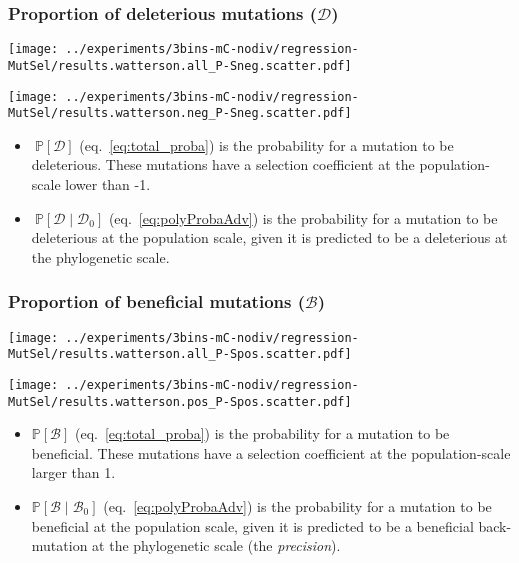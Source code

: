 \documentclass[12pt]{article}
\newcommand{\proba}{\mathbb{P}}
\newcommand{\SphyDel}{\mathcal{D}_0}
\newcommand{\SphyBen}{\mathcal{B}_0}
\newcommand{\given}{\mid}
\newcommand{\SpopDel}{\mathcal{D}}
\newcommand{\SpopBen}{\mathcal{B}}
\begin{document}
    \subsubsection{Proportion of deleterious mutations ($\SpopDel$)}\label{subsec:proportion-deleterious-mutations}
    \begin{minipage}{0.49\linewidth}
        \texttt{[image: ../experiments/3bins-mC-nodiv/regression-MutSel/results.watterson.all\_P-Sneg.scatter.pdf]}
    \end{minipage}
    \begin{minipage}{0.49\linewidth}
        \texttt{[image: ../experiments/3bins-mC-nodiv/regression-MutSel/results.watterson.neg\_P-Sneg.scatter.pdf]}
    \end{minipage}
    \begin{itemize}
        \item $\ \proba [ \SpopDel ]$ (eq.~\ref{eq:total_proba}) is the probability for a mutation to be deleterious.
        These mutations have a selection coefficient at the population-scale lower than -1.
        \item $\ \proba [ \SpopDel \given \SphyDel ]$ (eq.~\ref{eq:polyProbaAdv}) is the probability for a mutation to be deleterious at the population scale, given it is predicted to be a deleterious at the phylogenetic scale.
    \end{itemize}

    \subsubsection{Proportion of beneficial mutations ($\SpopBen$)}\label{subsec:proportion-beneficial-mutations}
    \begin{minipage}{0.49\linewidth}
        \texttt{[image: ../experiments/3bins-mC-nodiv/regression-MutSel/results.watterson.all\_P-Spos.scatter.pdf]}
    \end{minipage}
    \begin{minipage}{0.49\linewidth}
        \texttt{[image: ../experiments/3bins-mC-nodiv/regression-MutSel/results.watterson.pos\_P-Spos.scatter.pdf]}
    \end{minipage}
    \begin{itemize}
        \item $\proba [ \SpopBen ]$ (eq.~\ref{eq:total_proba}) is the probability for a mutation to be beneficial.
        These mutations have a selection coefficient at the population-scale larger than 1.
        \item $\proba [ \SpopBen \given \SphyBen]$ (eq.~\ref{eq:polyProbaAdv}) is the probability for a mutation to be beneficial at the population scale, given it is predicted to be a beneficial back-mutation at the phylogenetic scale (the \textit{precision}).
    \end{itemize}
\end{document}
